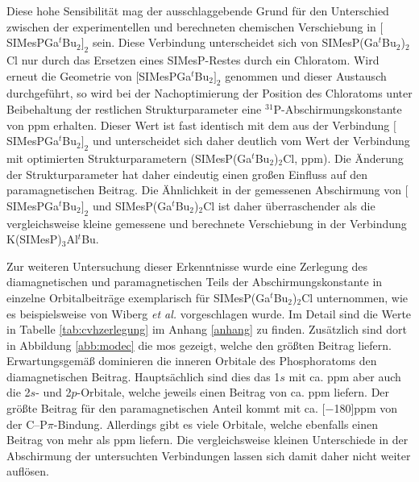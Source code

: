 Diese hohe Sensibilität mag der ausschlaggebende Grund für den Unterschied zwischen der experimentellen und berechneten chemischen Verschiebung in $[$SIMesPGa$^\textit{t}$Bu$_2]_2$ sein. Diese Verbindung unterscheidet sich von SIMesP(Ga$^\textit{t}$Bu$_2$)$_2$Cl nur durch das Ersetzen eines SIMesP-Restes durch ein Chloratom. Wird erneut die Geometrie von $[$SIMesPGa$^\textit{t}$Bu$_2]_2$ genommen und dieser Austausch durchgeführt, so wird bei der Nachoptimierung der Position des Chloratoms unter Beibehaltung der restlichen Strukturparameter eine $^{31}$P-Abschirmungskonstante von \unit[336]{ppm} erhalten. Dieser Wert ist fast identisch mit dem aus der Verbindung $[$SIMesPGa$^\textit{t}$Bu$_2]_2$ und unterscheidet sich daher deutlich vom Wert der Verbindung mit optimierten Strukturparametern (SIMesP(Ga$^\textit{t}$Bu$_2$)$_2$Cl, \unit[380]{ppm}). Die Änderung der Strukturparameter hat daher eindeutig einen großen Einfluss auf den paramagnetischen Beitrag. Die Ähnlichkeit in der gemessenen Abschirmung von $[$SIMesPGa$^\textit{t}$Bu$_2]_2$ und SIMesP(Ga$^\textit{t}$Bu$_2$)$_2$Cl ist daher überraschender als die vergleichsweise kleine gemessene und berechnete Verschiebung in der Verbindung K(SIMesP)$_3$Al$^\textit{t}$Bu.

Zur weiteren Untersuchung dieser Erkenntnisse wurde eine Zerlegung des diamagnetischen und paramagnetischen Teils der Abschirmungskonstante in einzelne Orbitalbeiträge exemplarisch für SIMesP(Ga$^\textit{t}$Bu$_2$)$_2$Cl unternommen, wie es beispielsweise von Wiberg \textit{et al.}\supercite{wiberg1998nmr} vorgeschlagen wurde. Im Detail sind die Werte in Tabelle \ref{tab:cvhzerlegung} im Anhang \ref{anhang} zu finden. Zusätzlich sind dort in Abbildung \ref{abb:modec} die \acp{mo} gezeigt, welche den größten Beitrag liefern. Erwartungsgemäß dominieren die inneren Orbitale des Phosphoratoms den diamagnetischen Beitrag. Hauptsächlich sind dies das 1$s$ mit ca. \unit[500]{ppm} aber auch die 2$s$- und 2$p$-Orbitale, welche jeweils einen Beitrag von ca. \unit[100]{ppm} liefern. Der größte Beitrag für den paramagnetischen Anteil kommt mit ca. \unit[$-$180]{ppm} von der C--P$\pi$-Bindung. Allerdings gibt es viele Orbitale, welche ebenfalls einen Beitrag von mehr als \unit[10]{ppm} liefern. Die vergleichsweise kleinen Unterschiede in der Abschirmung der untersuchten Verbindungen lassen sich damit daher nicht weiter auflösen.




